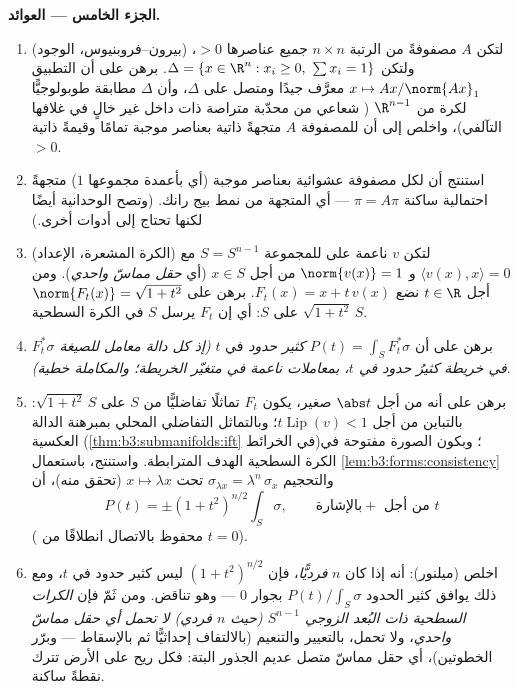 \begin{problem}
\medskip
\noindent\textbf{الجزء الخامس --- العوائد.}
\begin{enumerate}[resume]
  \item (بيرون--فروبنيوس، الوجود) لتكن $A$ مصفوفةً من الرتبة
        $n\times n$ جميع عناصرها $> 0$، ولتكن $\Delta = \{x \in \R^n : x_i \geq 0,\ \sum x_i =
        1\}$. برهن على
        أن التطبيق $x \mapsto Ax/\norm{Ax}_1$ معرَّف جيدًا ومتصل على $\Delta$، وأن
        $\Delta$ مطابقة طوبولوجيًّا لكرة  من $\R^{n-1}$
        ( شعاعي من محدّبة متراصة ذات داخل غير
        خالٍ في غلافها التآلفي)، واخلص إلى أن للمصفوفة $A$
        متجهةً ذاتية بعناصر موجبة تمامًا وقيمةً ذاتية $> 0$.
  \item استنتج أن لكل مصفوفة عشوائية بعناصر موجبة (أي بأعمدة
        مجموعها $1$) متجهةً احتمالية ساكنة $\pi = A\pi$ ---
        أي المتجهة من نمط بيج رانك. (وتصح الوحدانية أيضًا لكنها
        تحتاج إلى أدوات أخرى.)
  \item (الكرة المشعرة، الإعداد) لتكن $v$ ناعمة على 
        للمجموعة $S = S^{n-1}$ مع $\langle v(x),
        x\rangle = 0$ و $\norm{v(x)} = 1$ من أجل
        $x \in S$ (أي \emph{حقل مماسّ واحدي}). ومن أجل
        $t \in \R$ نضع $F_t(x) = x + t\,v(x)$. برهن على $\norm{F_t(x)} = \sqrt{1 + t^2}$ على $S$: أي إن
        $F_t$ يرسل $S$ في الكرة السطحية $\sqrt{1+t^2}\,S$.
  \item برهن على أن $P(t) = \int_SF_t^*\sigma$ \emph{كثير حدود} في $t$ \emph{(إذ
        كل دالة معامل للصيغة $F_t^*\sigma$ في خريطة كثيرُ حدود
        في $t$، بمعاملات ناعمة في متغيّر الخريطة؛ والمكاملة
        خطية)}.
  \item برهن على أنه من أجل $\abs t$ صغير، يكون $F_t$ تماثلًا
        تفاضليًّا من $S$ على $\sqrt{1+t^2}\,S$: بالتباين من أجل $t\operatorname{Lip}(v) < 1$؛
        وبالتماثل التفاضلي المحلي بمبرهنة الدالة العكسية
        (\cref{thm:b3:submanifolds:ift} في الخرائط)؛ وبكون الصورة مفتوحة  في
        الكرة السطحية الهدف المترابطة. واستنتج، باستعمال
        \cref{lem:b3:forms:consistency} والتحجيم $\sigma_{\lambda x} =
        \lambda^{n}\,\sigma_x$ تحت $x \mapsto \lambda x$ (تحقق منه)، أن
        \[
        P(t) = \pm(1 + t^2)^{n/2}\int_S\sigma,
        \qquad\text{بالإشارة} + \text{ من أجل } t
        \]
        ( محفوظ بالاتصال انطلاقًا من $t = 0$).
  \item اخلص (ميلنور): أنه إذا كان $n$ \emph{فرديًّا}، فإن
        $(1 +
        t^2)^{n/2}$ ليس كثير حدود في $t$، ومع ذلك يوافق كثير الحدود
        $P(t)/\int_S\sigma$ بجوار $0$ --- وهو تناقض. ومن ثَمّ فإن \emph{الكرات
        السطحية ذات البُعد الزوجي $S^{n-1}$ (حيث $n$ فردي) لا
        تحمل أي حقل مماسّ واحدي}، ولا تحمل، بالتعيير والتنعيم
        (بالالتفاف إحداثيًّا ثم بالإسقاط --- وبرّر الخطوتين)،
        أي حقل مماسّ متصل عديم الجذور البتة: فكل ريح على الأرض
        تترك نقطةً ساكنة.


\end{enumerate}
\end{problem}
